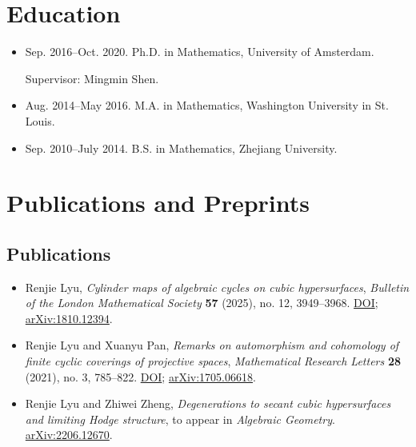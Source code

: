 \documentclass[letterpaper]{article}
\begin{document}
\section*{Education}

\begin{itemize}

  \item Sep. 2016--Oct. 2020. Ph.D. in Mathematics, University of Amsterdam.

  Supervisor: Mingmin Shen.

  \item Aug. 2014--May 2016. M.A. in Mathematics, Washington University in St. Louis.

  \item Sep. 2010--July 2014. B.S. in Mathematics, Zhejiang University.
\end{itemize}

\section*{Publications and Preprints}

\subsection*{Publications}
\begin{itemize}
\item Renjie Lyu, \textit{Cylinder maps of algebraic cycles on cubic hypersurfaces},
\textit{Bulletin of the London Mathematical Society} \textbf{57} (2025), no. 12,
3949--3968. \href{https://doi.org/10.1112/blms.70200}{DOI};
\href{https://arxiv.org/abs/1810.12394}{arXiv:1810.12394}.

\item Renjie Lyu and Xuanyu Pan, \textit{Remarks on automorphism and cohomology
of finite cyclic coverings of projective spaces}, \textit{Mathematical Research
Letters} \textbf{28} (2021), no. 3, 785--822.
\href{https://doi.org/10.4310/MRL.2021.v28.n3.a7}{DOI};
\href{https://arxiv.org/abs/1705.06618}{arXiv:1705.06618}.
\end{itemize}

\begin{itemize}
\item Renjie Lyu and Zhiwei Zheng, \textit{Degenerations to secant cubic
hypersurfaces and limiting Hodge structure}, to appear in
\textit{Algebraic Geometry}.
\href{https://arxiv.org/abs/2206.12670}{arXiv:2206.12670}.
\end{itemize}
\end{document}
